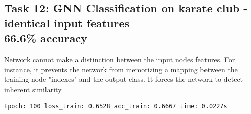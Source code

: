 \documentclass[a4paper]{article}
\begin{document}
\subsection*{Task 12: GNN Classification on karate club - identical input features \\ 66.6\% accuracy}
Network cannot make a distinction between the input nodes features.
For instance, it prevents the network from memorizing a mapping between the training node "indexes" and the output class.
It forces the network to detect inherent similarity.

\begin{verbatim}
Epoch: 100 loss_train: 0.6528 acc_train: 0.6667 time: 0.0227s
\end{verbatim}

\end{document}
